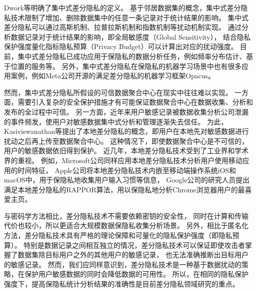 Dwork等\cite{DBLP:conf/icalp/Dwork06}明确了集中式差分隐私的定义。
基于邻居数据集的概念，集中式差分隐私技术限制了增加、删除数据集中的任意一条记录对于统计结果的影响。
集中式差分隐私可以通过高斯机制\cite{nikolov2013geometry}、拉普拉斯机制\cite{dwork2006calibrating, dwork2016calibrating}和指数机制\cite{mcsherry2007mechanism}等扰动机制实现。
通过分析数据记录对于统计结果的影响，即全局敏感度（Global Sensitivity），
结合隐私保护强度量化指标隐私预算（Privacy Budget）可以计算出对应的扰动强度。
目前，集中式差分隐私已成功应用于保隐私的数据分析任务，例如频率分布估计\cite{hay2010boosting, zhang2014towards, acs2012differentially}、基于位置的服务\cite{andres2013geo, xiao2015protecting, hardt2010geometry}等。
另外，集中式差分隐私在保隐私的机器学习场景中也有很多应用案例\cite{abadi2016deep, 刘俊旭2020机器学习的隐私保护研究综述}，例如Meta公司开源的满足差分隐私的机器学习框架Opacus\cite{yousefpour2021opacus}。

然而，集中式差分隐私所假设的可信数据聚合中心在现实中往往难以实现。
一方面，需要引入复杂的安全保护措施才有可能保证数据聚合中心在数据收集、分析和发布的全过程中可信\cite{chen2017constrained, zhou2021node}。
另一方面，近年来用户敏感记录被数据收集分析公司泄漏的事件频发\cite{FacebookCohen2018, TribuneindiaKhaira2018, ConfidentialGreenbone2019}，使用户对敏感数据集中式分析和管理逐渐失去信任。
为此，Kasiviswanathan等\cite{kasiviswanathan2011can}提出了本地差分隐私的概念，即用户在本地先对敏感数据进行扰动之后再上传至数据聚合中心。
这种情况下，即使数据聚合中心是不可信的，用户的敏感数据依旧得到保护。
近几年，本地差分隐私技术受到了工业界和学术界的重视\cite{DBLP:conf/wsdm/KenthapadiMT19}。
例如，Microsoft公司同样应用本地差分隐私技术分析用户使用移动应用的时间特征\cite{DBLP:conf/nips/DingKY17}，
Apple公司将本地差分隐私技术内嵌至移动端操作系统iOS和macOS中，用于保隐私地收集用户输入习惯等信息\cite{LearningDifferential2017}，
Google公司的研究人员提出满足本地差分隐私的RAPPOR算法，用以保隐私地分析Chrome浏览器用户的最喜爱主页\cite{DBLP:conf/ccs/ErlingssonPK14}。

与密码学方法相比，差分隐私技术不需要依赖密钥的安全性，
同时在计算和传输代价也较小，所以更适合大规模数据保隐私收集分析场景。
另外，相比于匿名化方法，差分隐私技术具有严格的理论保障和可量化的隐私保护强度（即隐私预算）。
特别是数据记录之间相互独立的情况，差分隐私技术可以保证即使攻击者掌握了数据集除目标用户之外的其他用户的敏感记录，
也无法准确推断出目标用户的敏感记录\cite{张啸剑2014面向数据发布和分析的差分隐私保护, 熊平2014差分隐私保护及其应用, 李杨2012差分隐私保护研究综述}。
然而，我们应同样意识到，差分隐私技术是一种基于数据扰动的策略，在保护用户敏感数据的同时会降低数据的可用性。
所以，在相同的隐私保护强度下，提高保隐私统计分析结果的准确性是目前差分隐私领域研究的重点。


